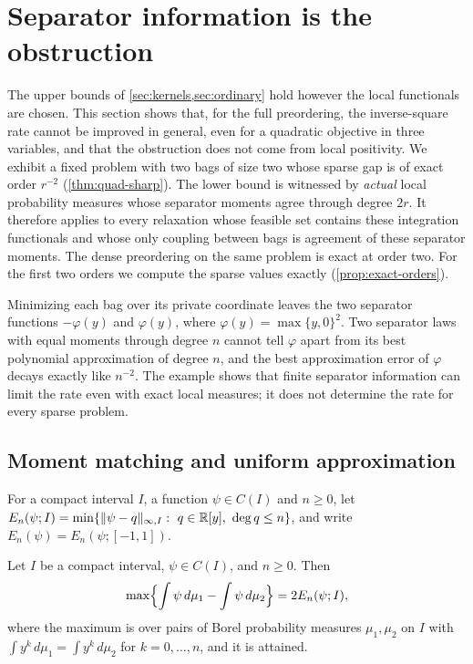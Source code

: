 \section{Separator information is the obstruction}\label{sec:sharpness}

The upper bounds of \cref{sec:kernels,sec:ordinary} hold however the local
functionals are chosen. This section shows that, for the full preordering,
the inverse-square rate cannot be improved in general, even for a quadratic
objective in three variables, and that the obstruction does not come from
local positivity. We exhibit a fixed problem with two bags of size two whose
sparse gap is of exact order $r^{-2}$ (\cref{thm:quad-sharp}). The lower
bound is witnessed by \emph{actual} local probability measures whose
separator moments agree through degree $2r$. It therefore applies to every
relaxation whose feasible set contains these integration functionals and
whose only coupling between bags is agreement of these separator moments.
The dense preordering on the same problem is
exact at order two. For the first two orders we compute the sparse values
exactly (\cref{prop:exact-orders}).

Minimizing each bag over its private coordinate leaves the two separator
functions $-\varphi(y)$ and $\varphi(y)$, where
$\varphi(y)=\max\{y,0\}^2$. Two separator laws with equal
moments through degree $n$ cannot tell $\varphi$ apart from its best
polynomial approximation of degree $n$, and the best approximation error of
$\varphi$ decays exactly like $n^{-2}$. The example shows that finite
separator information can limit the rate even with exact local measures; it
does not determine the rate for every sparse problem.

\subsection{Moment matching and uniform approximation}
\label{sec:shp-matching}

For a compact interval $I$, a function $\psi\in C(I)$ and $n\ge0$, let
$E_n(\psi;I)=\min\{\norm{\psi-q}_{\infty,I}:\ q\in\R[y],\ \deg q\le n\}$,
and write $E_n(\psi)=E_n(\psi;[-1,1])$.

\begin{lemma}\label{lem:moment-matching-general}
Let $I$ be a compact interval, $\psi\in C(I)$, and $n\ge0$. Then
\[
  \max\Bigl\{\int\psi\,d\mu_1-\int\psi\,d\mu_2\Bigr\}=2E_n(\psi;I),
\]
where the maximum is over pairs of Borel probability measures $\mu_1,\mu_2$
on $I$ with $\int y^k\,d\mu_1=\int y^k\,d\mu_2$ for $k=0,\dots,n$, and it
is attained.
\end{lemma}

